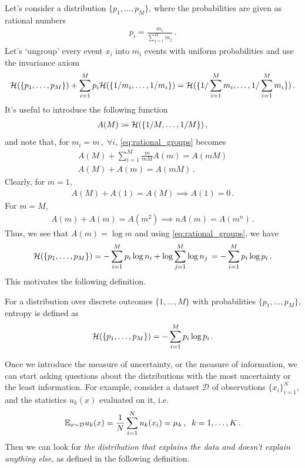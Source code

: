 Let's consider a distribution $\{p_1,\ldots,p_M\}$, where the probabilities are given as rational numbers
\begin{align}
    p_i = \frac{m_i}{\sum_{j=1}^M m_j}\,.
\end{align}
Let's `ungroup' every event $x_i$ into $m_i$ events with uniform probabilities and use the invariance axiom
\begin{align}
    \mathcal{H}(\{p_1,\ldots,p_M\}) + \sum_{i=1}^M p_i\mathcal{H}(\{1/m_i,\ldots,1/m_i\}) = \mathcal{H}(\{1/\sum_{i=1}^M m_i,\ldots,1/\sum_{i=1}^M m_i\})\,.
    \label{eq:rational_groups}
\end{align}
It's useful to introduce the following function
\begin{align}
    A(M) \coloneqq \mathcal{H}(\{1/M,\ldots,1/M\})\,,
\end{align}
and note that, for $m_i = m\,,\;\forall i$, \cref{eq:rational_groups} becomes
\begin{align}
    A(M) + \sum_{i=1}^M \frac{m}{mM} A(m) = A(mM)\\
    A(M) + A(m) = A(mM)\,.
\end{align}
Clearly, for $m=1$,
\begin{align}
    A(M) + A(1) = A(M) \implies A(1) = 0\,.
\end{align}
For $m=M$,
\begin{align}
    A(m) + A(m) = A(m^2) \implies nA(m) = A(m^n)\,.
\end{align}
Thus, we see that $A(m) = \log m$ and using \cref{eq:rational_groups}, we have
\begin{align}
    \mathcal{H}(\{p_1,\ldots,p_M\}) = - \sum_{i=1}^M p_i\log n_i + \log \sum_{j=1}^M \log n_j\, = - \sum_{i=1}^M p_i\log p_i\,.
\end{align}
This motivates the following definition.

\begin{mybox}
\begin{definition}[Entropy]\label{def:entropy}
    For a distribution over discrete outcomes $\{1,\ldots,M\}$ with probabilities $\{p_1,\ldots,p_M\}$, entropy is defined as
    \begin{align}
        \mathcal{H}(\{p_1,\ldots,p_M\}) = -\sum_{i=1}^M p_i \log p_i\,.
    \end{align}
\end{definition}
\end{mybox}

Once we introduce the measure of uncertainty, or the measure of information, we can start asking questions about the distributions with the most uncertainty or the least information.
For example, consider a dataset $\mathcal{D}$ of observations $\{x_i\}_{i=1}^N$, and the statistics $u_k(x)$ evaluated on it, i.e.
\begin{align}
    \mathbb{E}_{x\sim \mathcal{D}} u_k(x) = \frac{1}{N}\sum_{i=1}^N u_k(x_i) = \mu_k\,, \;\; k = 1,\ldots,K\,.
\end{align}
Then we can look for \textit{the distribution that explains the data and doesn't explain anything else}, as defined in the following definition.

